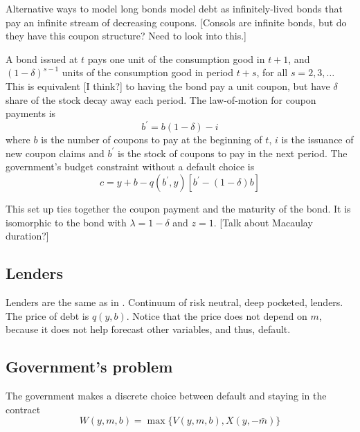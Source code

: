 \documentclass[11pt, pdftex]{article}
\begin{document}
\begin{mybox}{Alternative ways to model long bonds}
\citet{hatchondo2009long} model debt as  infinitely-lived bonds that pay an infinite stream of decreasing coupons. [Consols are infinite bonds, but do they have this coupon structure? Need to look into this.]

A bond issued at $t$ pays one unit of the consumption good in $t+1$, and $(1-\delta)^{s-1}$ units of the consumption good in period $t+s$, for all $s=2,3,\ldots$ This is equivalent [I think?] to having the bond pay a unit coupon, but have $\delta$ share of the stock decay away each period. The law-of-motion for coupon payments is
\begin{equation}\label{}
  b^\prime = b(1-\delta)-i
\end{equation}
where $b$ is the number of coupons to pay at the beginning of $t$, $i$ is the issuance of new coupon claims and $b^\prime$ is the stock of coupons to pay in the next period. The government's budget constraint without a default choice is
\begin{equation}\label{}
  c=y+b-q(b^\prime,y)[b^\prime-(1-\delta)b]
\end{equation}

This set up ties together the coupon payment and the maturity of the bond. It is isomorphic to the \citet{chaterjeeEyigungor} bond with $\lambda=1-\delta$ and $z=1$. [Talk about Macaulay duration?]
\end{mybox}

\subsection*{Lenders}
Lenders are the same as in \citet{A08}. Continuum of risk neutral, deep pocketed, lenders. The price of debt is $q(y,b)$. Notice that the price does not depend on $m$, because it does not help forecast other variables, and thus, default.

\subsection*{Government's problem}
The government makes a discrete choice between default and staying in the contract
\begin{equation}\label{eq:gov-discrete}
  W(y,m,b)=\max \{V(y,m,b),X(y,-\bar{m})\}
\end{equation}
\end{document}
